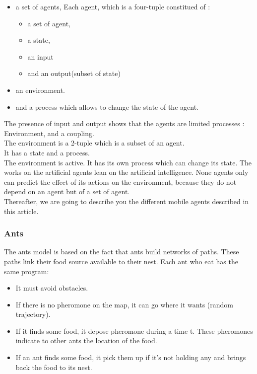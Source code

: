 \begin{itemize}
\item a set of agents,
Each agent, which is a four-tuple constitued of : 
\begin{itemize}
\item a set of agent,
\item a state, 
\item an input 
\item and an output(subset of state)
\end{itemize}
\item an environment. 
\item and a process which allows to change the state of the agent.
\end{itemize}

The presence of input and output shows that the agents are limited processes : Environment, and a coupling.\\
The environment is a 2-tuple which is a subset of an agent.\\
It has a state and a process.\\ 
The environment is active. It has its own process which can change its state. The works on the artificial agents lean on the artificial intelligence. None agents only can predict the effect of its actions on the environment, because they do not depend on an agent but of a set of agent.\\
Thereafter, we are going to describe you the different mobile agents described in this article.

\newpage

\subsubsection{Ants}

The ants model is based on the fact that ants build networks of paths. These paths link their food source available to their nest.
Each ant who eat has the same program:

\begin{itemize}
\item It must avoid obstacles.
\item If there is no pheromone on the map, it can go where it wants (random trajectory).
\item If it finds some food, it depose pheromone during a time t. These pheromones indicate to other ants the location of the food.
\item If an ant finds some food, it pick them up if it's not holding any and brings back the food to its nest.
\end{itemize}

